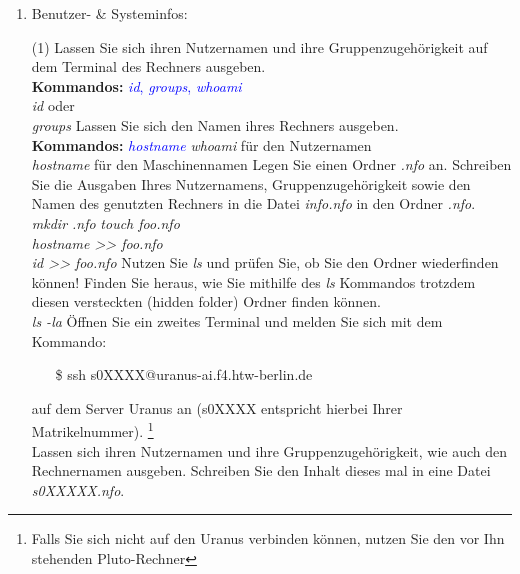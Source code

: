 \documentclass[paper=a4,fontsize=11pt]{scrartcl}%
\numberwithin{equation}{section}
\begin{document}
{\begin{enumerate}
\begin{tasks}
        \end{tasks}
        \footnote{.md steht für Markdown, welches ein Format für Textdateien ist, ähnlich wie .pdf oder .doc-Dateien.}
        \footnote{\url{https://github.com/retext-project}}
         \footnote{Sie können auch mit vi, vim oder emacs arbeiten!}
  \item Benutzer- \& Systeminfos:
        \begin{tasks}(1)       
          \task Lassen Sie sich ihren Nutzernamen und ihre Gruppenzugehörigkeit auf dem Terminal des Rechners ausgeben.\\
          \textbf{Kommandos:} \textcolor{blue}{\emph{id}, \emph{groups}, \emph{whoami}}\\
          \textit{id} oder\\
          \textit{groups}
          \task Lassen Sie sich den Namen ihres Rechners ausgeben.\\
          \textbf{Kommandos:} \textcolor{blue}{\emph{hostname}}
          \textit{whoami} für den Nutzernamen\\
          \textit{hostname} für den Maschinennamen
          \task Legen Sie einen Ordner \emph{.nfo} an. Schreiben Sie die Ausgaben Ihres Nutzernamens, Gruppenzugehörigkeit sowie den Namen des genutzten Rechners in die Datei \emph{info.nfo} in den Ordner \emph{.nfo}.\\
          \textit{mkdir .nfo}
          \textit{touch foo.nfo}\\
          \textit{hostname >> foo.nfo}\\
          \textit{id >> foo.nfo}
          \task Nutzen Sie \emph{ls} und prüfen Sie, ob Sie den Ordner wiederfinden können! Finden Sie heraus, wie Sie mithilfe des \emph{ls} Kommandos trotzdem diesen versteckten (hidden folder) Ordner finden können.\\
           \textit{ls -la}  
          \task Öffnen Sie ein zweites Terminal und melden Sie sich mit dem Kommando:
          \begin{itemize}
          \item[\$]ssh s0XXXX@uranus-ai.f4.htw-berlin.de
          \end{itemize}
           auf dem Server Uranus an (s0XXXX entspricht hierbei Ihrer Matrikelnummer). \footnote{Falls Sie sich nicht auf den Uranus verbinden können, nutzen Sie den vor Ihn stehenden Pluto-Rechner} \\
           Lassen sich ihren Nutzernamen und ihre Gruppenzugehörigkeit, wie auch den Rechnernamen ausgeben. Schreiben Sie den Inhalt dieses mal in eine Datei \emph{s0XXXXX.nfo}.\\

\end{tasks}
\end{enumerate}}
\end{document}
